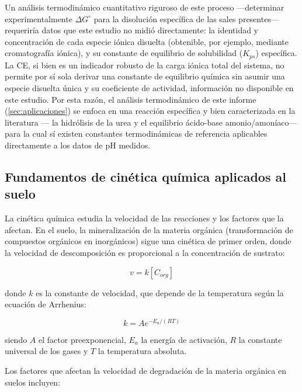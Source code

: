 \documentclass[fleqn]{jaes}
\begin{document}
Un análisis termodinámico cuantitativo riguroso de este proceso —determinar experimentalmente $\Delta G^\circ$ para la disolución específica de las sales presentes— requeriría datos que este estudio no midió directamente: la identidad y concentración de cada especie iónica disuelta (obtenible, por ejemplo, mediante cromatografía iónica), y su constante de equilibrio de solubilidad ($K_{ps}$) específica. La CE, si bien es un indicador robusto de la carga iónica total del sistema, no permite por sí sola derivar una constante de equilibrio química sin asumir una especie disuelta única y su coeficiente de actividad, información no disponible en este estudio. Por esta razón, el análisis termodinámico de este informe (\cref{sec:aplicaciones}) se enfoca en una reacción específica y bien caracterizada en la literatura --- la hidrólisis de la urea y el equilibrio ácido-base amonio/amoníaco--- para la cual sí existen constantes termodinámicas de referencia aplicables directamente a los datos de pH medidos.

\subsection{Fundamentos de cinética química aplicados al suelo}

La cinética química estudia la velocidad de las reacciones y los factores que la afectan. En el suelo, la mineralización de la materia orgánica (transformación de compuestos orgánicos en inorgánicos) sigue una cinética de primer orden, donde la velocidad de descomposición es proporcional a la concentración de sustrato:

\begin{equation}
v = k [C_{org}]
\label{eq:cinetica_orden1}
\end{equation}

donde $k$ es la constante de velocidad, que depende de la temperatura según la ecuación de Arrhenius:

\begin{equation}
k = A e^{-E_a / (RT)}
\label{eq:arrhenius}
\end{equation}

siendo $A$ el factor preexponencial, $E_a$ la energía de activación, $R$ la constante universal de los gases y $T$ la temperatura absoluta.

Los factores que afectan la velocidad de degradación de la materia orgánica en suelos incluyen:
\end{document}
